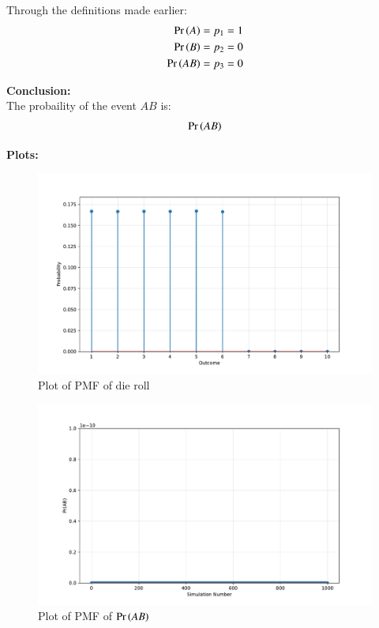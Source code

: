 \documentclass[journal]{IEEEtran}
\begin{document}
Through the definitions made earlier:
\begin{align}
	\Pr\left(A\right) = p_1 =1 \\
	\Pr\left(B\right) = p_2 = 0\\
	\Pr\left(AB\right) = p_3 = 0
\end{align}

\textbf{Conclusion:} \\
The probaility of the event $AB$ is:
\begin{align}
    \Pr\left(AB\right)
\end{align}

\textbf{Plots:}
\begin{figure}[h]
	\centering
	\includegraphics[width=\columnwidth]{figs/die_roll_pmf.pdf}
	\caption{Plot of PMF of die roll}
\end{figure}
\begin{figure}[h]
	\centering
	\includegraphics[width=\columnwidth]{figs/Pr_AB_simulation_results.pdf}
	\caption{Plot of PMF of $\Pr\left(AB\right)$}
\end{figure}
\end{document}
